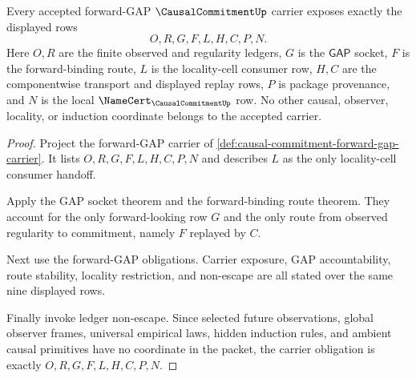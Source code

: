 \begin{theorem}
\label{thm:causal-commitment-carrier-obligation}
Every accepted forward-GAP $\CausalCommitmentUp$ carrier exposes exactly the displayed rows
$$
O,R,G,F,L,H,C,P,N.
$$
Here $O,R$ are the finite observed and regularity ledgers, $G$ is the $\mathsf{GAP}$ socket, $F$ is the forward-binding route, $L$ is the locality-cell consumer row, $H,C$ are the componentwise transport and displayed replay rows, $P$ is package provenance, and $N$ is the local $\NameCert_{\CausalCommitmentUp}$ row. No other causal, observer, locality, or induction coordinate belongs to the accepted carrier.
\end{theorem}
\begin{proof}
Project the forward-GAP carrier of \autoref{def:causal-commitment-forward-gap-carrier}. It lists $O,R,G,F,L,H,C,P,N$ and describes $L$ as the only locality-cell consumer handoff.

Apply the GAP socket theorem and the forward-binding route theorem. They account for the only forward-looking row $G$ and the only route from observed regularity to commitment, namely $F$ replayed by $C$.

Next use the forward-GAP obligations. Carrier exposure, GAP accountability, route stability, locality restriction, and non-escape are all stated over the same nine displayed rows.

Finally invoke ledger non-escape. Since selected future observations, global observer frames, universal empirical laws, hidden induction rules, and ambient causal primitives have no coordinate in the packet, the carrier obligation is exactly $O,R,G,F,L,H,C,P,N$.
\end{proof}

